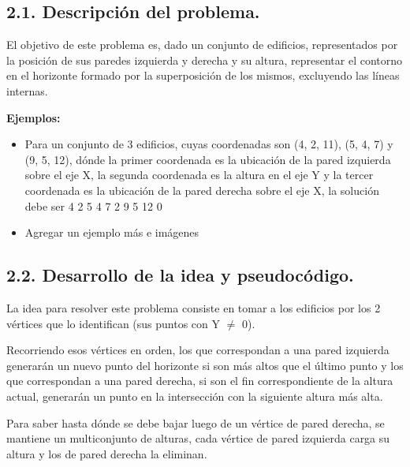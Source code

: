 \subsection{2.1. Descripción del problema.}

\vspace*{0.3cm}

El objetivo de este problema es, dado un conjunto de edificios, representados
por la posición de sus paredes izquierda y derecha y su altura, representar el
contorno en el horizonte formado por la superposición de los mismos, excluyendo
las líneas internas. \medskip

\textbf{Ejemplos:}
\begin{itemize}
  \item Para un conjunto de 3 edificios, cuyas coordenadas son (4, 2, 11),
  (5, 4, 7) y (9, 5, 12), dónde la primer coordenada es la ubicación de la pared
  izquierda sobre el eje X, la segunda coordenada es la altura en el eje Y y la
  tercer coordenada es la ubicación de la pared derecha sobre el eje X, la
  solución debe ser 4 2 5 4 7 2 9 5 12 0
  \item Agregar un ejemplo más e imágenes
\end{itemize}





\subsection{2.2. Desarrollo de la idea y pseudocódigo.}

\vspace*{0.3cm}

La idea para resolver este problema consiste en tomar a los edificios por los 2
vértices que lo identifican (sus puntos con Y $\neq$ 0).

Recorriendo esos vértices en orden, los que correspondan a una pared izquierda
generarán un nuevo punto del horizonte si son más altos que el último punto y
los que correspondan a una pared derecha, si son el fin correspondiente de la
altura actual, generarán un punto en la intersección con la siguiente altura
más alta.

Para saber hasta dónde se debe bajar luego de un vértice de pared derecha, se
mantiene un multiconjunto de alturas, cada vértice de pared izquierda carga su
altura y los de pared derecha la eliminan.

